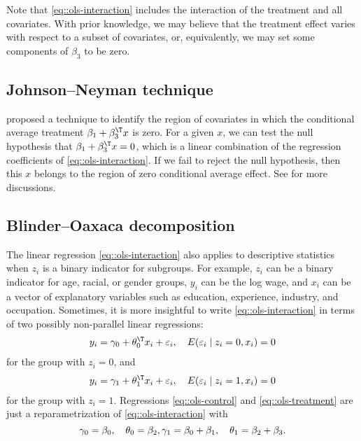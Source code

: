 Note that \eqref{eq::ols-interaction} includes the interaction of the treatment and all covariates. With prior knowledge, we may believe that the treatment effect varies with respect to a subset of covariates, or, equivalently, we may set some components of $\beta_3$ to be zero. 


 
 
 \subsection{Johnson--Neyman technique}

\citet{johnson1936tests} proposed a technique to identify the region of covariates in which the conditional average treatment $\beta_1 + \beta_3^{\T} x$ is zero. 
For a given $x$, we can test the null hypothesis that $\beta_1 + \beta_3^{\T} x = 0$, which is a linear combination of the regression coefficients of \eqref{eq::ols-interaction}. If we fail to reject the null hypothesis, then this $x$ belongs to the region of zero conditional average effect. 
See \citet{rogosa1981relationship} for more discussions. 



\subsection{Blinder--Oaxaca decomposition}

The linear regression \eqref{eq::ols-interaction} also applies to descriptive statistics when $z_i$ is a binary indicator for subgroups. For example, $z_i$ can be a binary indicator for age, racial, or gender groups, $y_i$ can be the log wage, and $x_i$ can be a vector of explanatory variables such as education, experience, industry, and occupation. 
Sometimes, it is more insightful to write \eqref{eq::ols-interaction} in terms of two possibly non-parallel linear regressions:
\begin{eqnarray}
\label{eq::ols-control}
y_i = \gamma_0 + \theta_0^{\T} x_i + \varepsilon_{i}, \quad 
E( \varepsilon_{i} \mid z_i =0, x_i ) = 0
\end{eqnarray}
for the group with $z_i = 0$, and
\begin{eqnarray}
\label{eq::ols-treatment}
y_i = \gamma_1 + \theta_1^{\T} x_i + \varepsilon_{i}, \quad
E( \varepsilon_{i} \mid z_i = 1, x_i ) = 0
\end{eqnarray}
for the group with $z_i = 1$. Regressions \eqref{eq::ols-control} and \eqref{eq::ols-treatment} are just a reparametrization of \eqref{eq::ols-interaction} with
$$
\gamma_0 = \beta_0,\quad
\theta_0 = \beta_2,\\
\gamma_1 =\beta_0 + \beta_1,\quad
\theta_1 = \beta_2 + \beta_3 . 
$$

